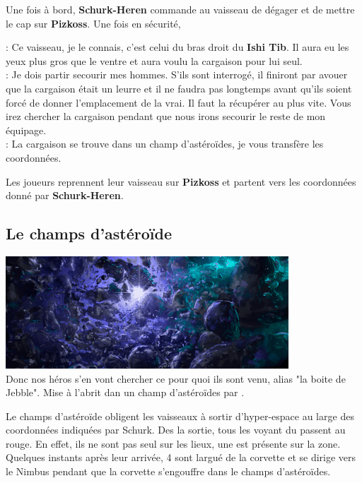 Une fois à bord, \textbf{Schurk-Heren} commande au vaisseau de dégager et de mettre le cap sur \textbf{Pizkoss}. Une fois en sécurité, 
\begin{quotebox}
    : Ce vaisseau, je le connais, c’est celui du bras droit du \textbf{Ishi Tib}. Il aura eu les yeux plus gros que le ventre et aura voulu la cargaison pour lui seul.\\
    : Je dois partir secourir mes hommes. S’ils sont interrogé, il finiront par avouer que la cargaison était un leurre et il ne faudra pas longtemps avant qu’ils soient forcé de donner l’emplacement de la vrai. Il faut la récupérer au plus vite. Vous irez chercher la cargaison pendant que nous irons secourir le reste de mon équipage.\\
    : La cargaison se trouve dans un champ d’astéroïdes, je vous transfère les coordonnées.
\end{quotebox}

Les joueurs reprennent leur vaisseau sur \textbf{Pizkoss} et partent vers les coordonnées donné par \textbf{Schurk-Heren}.

\subsection{Le champs d’astéroïde}
\noindent\includegraphics[width=\linewidth]{_img/dos-au-muur/places/asteroid-field.png}\\

Donc nos héros s’en vont chercher ce pour quoi ils sont venu,  alias "la boite de Jebble". Mise à l’abrit dan un champ d’astéroïdes par .

Le champs d’astéroïde obligent les vaisseaux à sortir d’hyper-espace au large des coordonnées indiquées par Schurk. Des la sortie, tous les voyant du  passent au rouge. En effet, ils ne sont pas seul sur les lieux, une  est présente sur la zone. Quelques instants après leur arrivée, 4  sont largué de la corvette et se dirige vers le Nimbus pendant que la corvette s’engouffre dans le champs d’astéroïdes.

